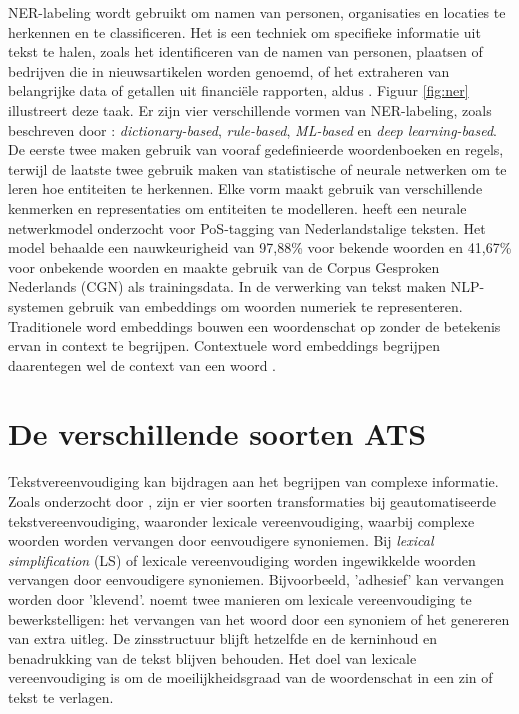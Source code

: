 NER-labeling wordt gebruikt om namen van personen, organisaties en locaties te herkennen en te classificeren. Het is een techniek om specifieke informatie uit tekst te halen, zoals het identificeren van de namen van personen, plaatsen of bedrijven die in nieuwsartikelen worden genoemd, of het extraheren van belangrijke data of getallen uit financiële rapporten, aldus \textcite{Jurafsky2014}. Figuur \ref{fig:ner} illustreert deze taak. Er zijn vier verschillende vormen van NER-labeling, zoals beschreven door \textcite{Li2018}: \textit{dictionary-based}, \textit{rule-based}, \textit{ML-based} en \textit{deep learning-based}. De eerste twee maken gebruik van vooraf gedefinieerde woordenboeken en regels, terwijl de laatste twee gebruik maken van statistische of neurale netwerken om te leren hoe entiteiten te herkennen. Elke vorm maakt gebruik van verschillende kenmerken en representaties om entiteiten te modelleren. \textcite{Poel2008} heeft een neurale netwerkmodel onderzocht voor PoS-tagging van Nederlandstalige teksten. Het model behaalde een nauwkeurigheid van 97,88\% voor bekende woorden en 41,67\% voor onbekende woorden en maakte gebruik van de Corpus Gesproken Nederlands (CGN) als trainingsdata. In de verwerking van tekst maken NLP-systemen gebruik van embeddings om woorden numeriek te representeren. Traditionele word embeddings bouwen een woordenschat op zonder de betekenis ervan in context te begrijpen. Contextuele word embeddings begrijpen daarentegen wel de context van een woord \autocite{Eisenstein2019}. 

\section{De verschillende soorten ATS}

Tekstvereenvoudiging kan bijdragen aan het begrijpen van complexe informatie. Zoals onderzocht door \textcite{Siddharthan2014}, zijn er vier soorten transformaties bij geautomatiseerde tekstvereenvoudiging, waaronder lexicale vereenvoudiging, waarbij complexe woorden worden vervangen door eenvoudigere synoniemen. Bij \textit{lexical simplification} (LS) of lexicale vereenvoudiging worden ingewikkelde woorden vervangen door eenvoudigere synoniemen. Bijvoorbeeld, 'adhesief' kan vervangen worden door 'klevend'. \textcite{Kandula2010} noemt twee manieren om lexicale vereenvoudiging te bewerkstelligen: het vervangen van het woord door een synoniem of het genereren van extra uitleg. De zinsstructuur blijft hetzelfde en de kerninhoud en benadrukking van de tekst blijven behouden. Het doel van lexicale vereenvoudiging is om de moeilijkheidsgraad van de woordenschat in een zin of tekst te verlagen.

